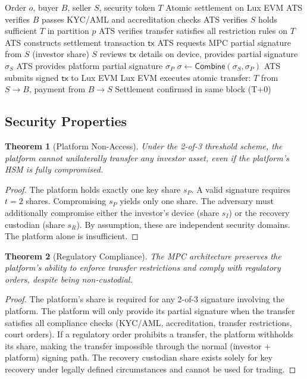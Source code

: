 \documentclass[11pt,a4paper]{article}
\newtheorem{theorem}{Theorem}
\begin{document}
\begin{algorithm}[H]
\caption{Non-custodial securities transfer.}
\label{alg:transfer}
\begin{algorithmic}[1]
\Require Order $o$, buyer $B$, seller $S$, security token $T$
\Ensure Atomic settlement on Lux EVM
\State ATS verifies $B$ passes KYC/AML and accreditation checks
\State ATS verifies $S$ holds sufficient $T$ in partition $p$
\State ATS verifies transfer satisfies all restriction rules on $T$
\State ATS constructs settlement transaction $\textsf{tx}$
\State ATS requests MPC partial signature from $S$ (investor share)
\State $S$ reviews $\textsf{tx}$ details on device, provides partial signature $\sigma_S$
\State ATS provides platform partial signature $\sigma_P$
\State $\sigma \gets \textsf{Combine}(\sigma_S, \sigma_P)$ 
\State ATS submits signed $\textsf{tx}$ to Lux EVM
\State Lux EVM executes atomic transfer: $T$ from $S \to B$, payment from $B \to S$
\State Settlement confirmed in same block (T+0)
\end{algorithmic}
\end{algorithm}

\subsection{Security Properties}

\begin{theorem}[Platform Non-Access]
Under the 2-of-3 threshold scheme, the platform cannot unilaterally transfer any investor asset, even if the platform's HSM is fully compromised.
\end{theorem}

\begin{proof}
The platform holds exactly one key share $s_P$. A valid signature requires $t = 2$ shares. Compromising $s_P$ yields only one share. The adversary must additionally compromise either the investor's device (share $s_I$) or the recovery custodian (share $s_R$). By assumption, these are independent security domains. The platform alone is insufficient.
\end{proof}

\begin{theorem}[Regulatory Compliance]
The MPC architecture preserves the platform's ability to enforce transfer restrictions and comply with regulatory orders, despite being non-custodial.
\end{theorem}

\begin{proof}
The platform's share is required for any 2-of-3 signature involving the platform. The platform will only provide its partial signature when the transfer satisfies all compliance checks (KYC/AML, accreditation, transfer restrictions, court orders). If a regulatory order prohibits a transfer, the platform withholds its share, making the transfer impossible through the normal (investor + platform) signing path. The recovery custodian share exists solely for key recovery under legally defined circumstances and cannot be used for trading.
\end{proof}
\end{document}
